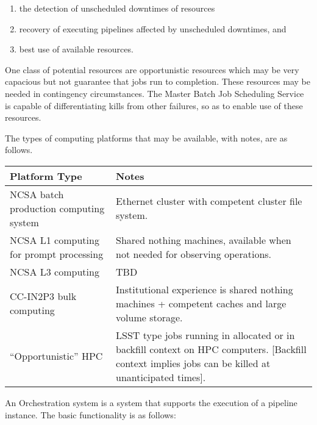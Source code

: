 \begin{enumerate}

\item the detection of unscheduled downtimes of resources

\item recovery of executing pipelines affected by unscheduled downtimes, and

\item best use of available resources.

\end{enumerate}

One class of potential resources  are opportunistic resources which may be very
capacious but not guarantee that jobs run to completion. These resources may be
needed in contingency circumstances. The Master Batch Job Scheduling Service is
capable of differentiating kills from other failures, so as to enable use of
these resources.

The types of computing platforms that may be available, with notes, are as
follows.

\begin{longtable}{|p{}|p{}|}\hline
\textbf{Platform Type} & \textbf{Notes} \\\hline
NCSA batch production computing system & Ethernet cluster with competent cluster
file system. \\\hline
NCSA L1 computing for prompt processing & Shared nothing machines, available
when not needed for observing operations. \\\hline
NCSA L3 computing & TBD \\\hline
CC-IN2P3 bulk computing & Institutional experience is shared nothing machines +
competent caches
and large volume storage. \\\hline
``Opportunistic'' HPC & LSST type jobs  running in allocated or in  backfill
context on HPC computers. [Backfill context implies jobs can be killed at
unanticipated times]. \\\hline
\end{longtable}

An Orchestration system is a system that supports the execution of a pipeline
instance. The basic functionality is as follows:

